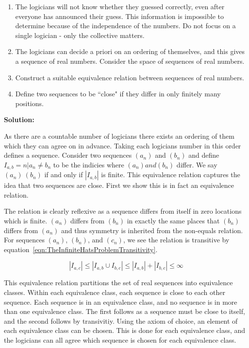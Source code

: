\begin{enumerate}
	\item The logicians will not know whether they guessed correctly, even after everyone has announced their guess. This information is impossible to determine because of the independence of the numbers. Do not focus on a single logician - only the collective matters.
	\item The logicians can decide a priori on an ordering of themselves, and this gives a sequence of real numbers. Consider the space of sequences of real numbers.
	\item Construct a suitable equivalence relation between sequences of real numbers.
	\item Define two sequences to be ``close" if they differ in only finitely many positions.
\end{enumerate}

\textbf{Solution:}

As there are a countable number of logicians there exists an ordering of them which they can agree on in advance. Taking each logicians number in this order defines a sequence. Consider two sequences $(a_n)$ and $(b_n)$ and define $I_{a, b} = {n | a_n \neq b_n}$ to be the indicies where $(a_n) and (b_n)$ differ. We say $(a_n) ~ (b_n)$ if and only if $|I_{a, b}|$ is finite. This equivalence relation captures the idea that two sequences are close. First we show this is in fact an equivalence relation.

The relation is clearly reflexive as a sequence differs from itself in zero locations which is finite. $(a_n)$ differs from $(b_n)$ in exactly the same places that $(b_n)$ differs from $(a_n)$ and thus symmetry is inherited from the non-equals relation. For sequences $(a_n)$, $(b_n)$, and $(c_n)$, we see the relation is transitive by equation~\ref{eqn:TheInfiniteHatsProblemTransitivity}.

\begin{equation}
	|I_{a, c}| \leq |I_{a, b} \cup I_{b, c}| \leq |I_{a, b}| + |I_{b, c}| \leq \infty
	\label{eqn:TheInfiniteHatsProblemTransitivity}
\end{equation}

This equivalence relation partitions the set of real sequences into equivalence classes. Within each equivalence class, each sequence is close to each other sequence. Each sequence is in an equivalence class, and no sequence is in more than one equivalence class. The first follows as a sequence must be close to itself, and the second follows by transivitiy. Using the axiom of choice, an element of each equivalence class can be chosen. This is done for each equivalence class, and the logicians can all agree which sequence is chosen for each equivalence class.

